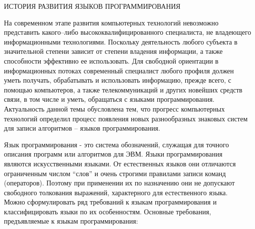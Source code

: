 



\thispagestyle{empty}
\begin{center}
ИСТОРИЯ РАЗВИТИЯ ЯЗЫКОВ ПРОГРАММИРОВАНИЯ
\end{center}

\renewcommand{\contentsname}{СОДЕРЖАНИЕ}
\noindent\tableofcontents


На современном этапе развития компьютерных технологий невозможно представить какого–либо высококвалифицированного специалиста, не владеющего информационными технологиями. Поскольку деятельность любого субъекта в значительной степени зависит от степени владения информации, а также способности эффективно ее использовать. Для свободной ориентации в информационных потоках современный специалист любого профиля должен уметь получать, обрабатывать и использовать информацию, прежде всего, с помощью компьютеров, а также телекоммуникаций и других новейших средств связи, в том числе и уметь, обращаться с языками программирования. \\

Актуальность данной темы обусловлена тем, что прогресс компьютерных технологий определил процесс появления новых разнообразных знаковых систем для записи алгоритмов – языков программирования. \\


Язык программирования - это система обозначений, служащая для точного описания программ или алгоритмов для ЭВМ. Языки программирования являются искусственными языками. От естественных языков они отличаются ограниченным числом “слов” и очень строгими правилами записи команд (операторов). Поэтому при применении их по назначению они не допускают свободного толкования выражений, характерного для естественного языка. \\

Можно сформулировать ряд требований к языкам программирования и классифицировать языки по их особенностям.
Основные требования, предъявляемые к языкам программирования: \\

